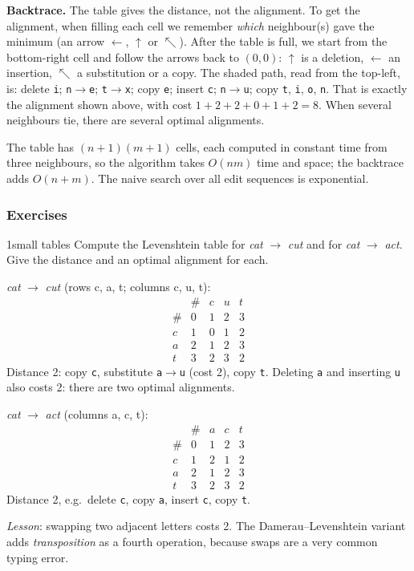\textbf{Backtrace.} The table gives the distance, not the alignment. To get the
alignment, when filling each cell we remember \emph{which} neighbour(s) gave the minimum
(an arrow $\leftarrow$, $\uparrow$ or $\nwarrow$). After the table is full, we start from
the bottom-right cell and follow the arrows back to $(0,0)$: $\uparrow$ is a deletion,
$\leftarrow$ an insertion, $\nwarrow$ a substitution or a copy. The shaded path, read from
the top-left, is: delete \texttt{i}; \texttt{n}$\to$\texttt{e}; \texttt{t}$\to$\texttt{x};
copy \texttt{e}; insert \texttt{c}; \texttt{n}$\to$\texttt{u}; copy \texttt{t},
\texttt{i}, \texttt{o}, \texttt{n}. That is exactly the alignment shown above, with cost
$1 + 2 + 2 + 0 + 1 + 2 = 8$. When several neighbours tie, there are several optimal
alignments.

\begin{nbintuition}
The table has $(n+1)(m+1)$ cells, each computed in constant time from three neighbours,
so the algorithm takes $O(nm)$ time and space; the backtrace adds $O(n+m)$. The naive
search over all edit sequences is exponential.
\end{nbintuition}

\subsubsection{Exercises}
\notinslides

\begin{nbexercise}{1}{small tables}
Compute the Levenshtein table for \emph{cat} $\to$ \emph{cut} and for \emph{cat} $\to$
\emph{act}. Give the distance and an optimal alignment for each.
\end{nbexercise}
\begin{nbsolution}
\emph{cat} $\to$ \emph{cut} (rows c, a, t; columns c, u, t):
\[
\begin{array}{c|cccc}
   & \# & c & u & t\\ \hline
\# & 0 & 1 & 2 & 3\\
c  & 1 & 0 & 1 & 2\\
a  & 2 & 1 & 2 & 3\\
t  & 3 & 2 & 3 & 2
\end{array}
\]
Distance 2: copy \texttt{c}, substitute \texttt{a}$\to$\texttt{u} (cost 2), copy
\texttt{t}. Deleting \texttt{a} and inserting \texttt{u} also costs 2: there are two
optimal alignments.

\emph{cat} $\to$ \emph{act} (columns a, c, t):
\[
\begin{array}{c|cccc}
   & \# & a & c & t\\ \hline
\# & 0 & 1 & 2 & 3\\
c  & 1 & 2 & 1 & 2\\
a  & 2 & 1 & 2 & 3\\
t  & 3 & 2 & 3 & 2
\end{array}
\]
Distance 2, e.g.\ delete \texttt{c}, copy \texttt{a}, insert \texttt{c}, copy \texttt{t}.

\emph{Lesson}: swapping two adjacent letters costs 2. The Damerau--Levenshtein variant
adds \emph{transposition} as a fourth operation, because swaps are a very common typing
error.
\end{nbsolution}

